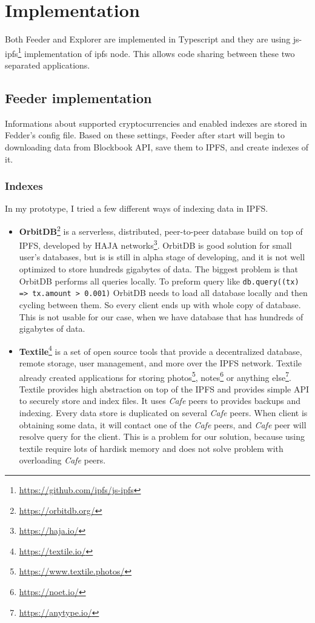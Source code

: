 \chapter{Implementation}

Both Feeder and Explorer are implemented in Typescript and they are using js-ipfs\footnote{\url{https://github.com/ipfs/js-ipfs}} implementation of ipfs node. This allows code sharing between these two separated applications.

\section{Feeder implementation}
Informations about supported cryptocurrencies and enabled indexes are stored in Fedder's config file. Based on these settings, Feeder after start will begin to downloading data from Blockbook API, save them to IPFS, and create indexes of it.

\subsection{Indexes}
In my prototype, I tried a few different ways of indexing data in IPFS.
\begin{itemize}
    \item \textbf{OrbitDB}\footnote{\url{https://orbitdb.org/}} is a serverless, distributed, peer-to-peer database build on top of IPFS, developed by HAJA networks\footnote{\url{https://haja.io/}}. OrbitDB is good solution for small user's databases, but is is still in alpha stage of developing, and it is not well optimized to store hundreds gigabytes of data. The biggest problem is that OrbitDB performs all queries locally. To preform query like \texttt{db.query((tx) => tx.amount > 0.001)} OrbitDB needs to load all database locally and then cycling between them. So every client ends up with whole copy of database. This is not usable for our case, when we have database that has hundreds of gigabytes of data.
    \cite{OrbitDBManual}
    \item \textbf{Textile}\footnote{\url{https://textile.io/}} is a set of open source tools that provide a decentralized database, remote storage, user management, and more over the IPFS network. Textile already created applications for storing photos\footnote{\url{https://www.textile.photos/}}, notes\footnote{\url{https://noet.io/}} or anything else\footnote{\url{https://anytype.io/}}. Textile provides high abstraction on top of the IPFS and provides simple API to securely store and index files. It uses \textit{Cafe} peers to provides backups and indexing. Every data store is duplicated on several \textit{Cafe} peers. When client is obtaining some data, it will contact one of the \textit{Cafe} peers, and \textit{Cafe} peer will resolve query for the client. This is a problem for our solution, because using textile require lots of hardisk memory and does not solve problem with overloading \textit{Cafe} peers.
    \cite{TextileWhitePaper}
\end{itemize}

